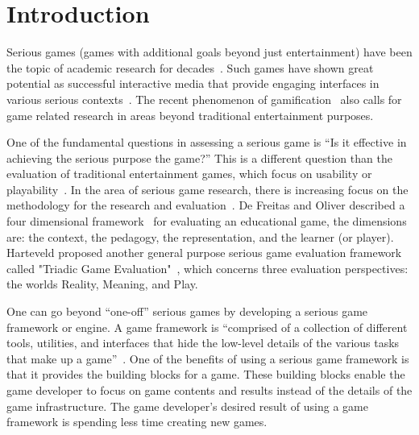 \documentclass{sigchi}
\begin{document}

\section{Introduction}

Serious games (games with additional goals beyond just entertainment)
have been the topic of academic research for
decades~\cite{Zyda2005}. Such games have shown great potential as successful
interactive media that provide engaging interfaces in various serious
contexts~\cite{mcgonigal2011reality,reeves2009total}. The recent phenomenon
of gamification~\cite{Deterding2011mt} also calls for game related
research in areas beyond traditional entertainment purposes.

One of the fundamental questions in assessing a serious game is ``Is it
effective in achieving the serious purpose the game?''
This is a different question than the evaluation of traditional
entertainment games, which focus on usability or
playability~\cite{song2007new}. In the area of serious game research,
there is increasing focus on the methodology for the research
and evaluation~\cite{Mayer2012233}. De Freitas and
Oliver described a four dimensional framework~\cite{de2006can} for
evaluating an educational game, the dimensions are: the context, the pedagogy,
the representation, and the learner (or player). Harteveld
proposed another general purpose serious game evaluation framework
called "Triadic Game Evaluation"~\cite{harteveld2010triadic}, which
concerns three evaluation perspectives: the worlds Reality, Meaning,
and Play.


One can go beyond ``one-off'' serious games by developing a serious game
framework or engine. A game framework is ``comprised of a collection of
different tools, utilities, and interfaces that hide the low-level
details of the various tasks that make up a
game''~\cite{sherrod2006ultimate}. One of the benefits of using a
serious game framework is that it provides the building blocks for a game.
These building blocks enable the game developer to focus on game
contents and results instead of the details of the game infrastructure.
The game developer's desired result of using a game framework is spending
less time creating new games.
\end{document}
